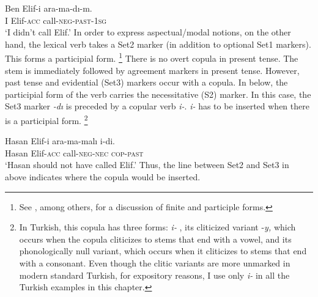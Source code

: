 \documentclass[output=paper]{langsci/langscibook}
\begin{document}
\ea%
    \label{kelepirex:key:4}
    \gll Ben Elif-i ara-ma-dı-m.\\
    I Elif-\textsc{acc} call-\textsc{neg}-\textsc{past}-\textsc{1sg} \\
    \glt `I didn't call Elif.'
\z 
In order to express aspectual/modal notions, on the other hand, the lexical verb takes a Set2 marker (in addition to optional Set1 markers). 
This forms a participial form.%
\footnote{%
    See \citealt{Lees1962,Kornfilt1996,Goksel1997,Kelepir2001,Sezer2001}, among others, 
    for a discussion of finite and participle forms.
} 
There is no overt copula in present tense. 
The stem is immediately followed by agreement markers in present tense. 
However, past tense and evidential (Set3) markers  occur with a copula. 
In  below, the participial form of the verb carries the necessitative (S2) marker. 
In this case, the Set3 marker \textit{-dı} is preceded by a copular verb \textit{i-}. 
\textit{i-} has to be inserted when there is a participial form.%
\footnote{%
    In Turkish, this copula has three forms: 
    \textit{i-} , 
    its cliticized variant -\textit{y,} which occurs when the copula cliticizes to stems that end with a vowel, 
    and its phonologically null variant, which occurs when it cliticizes to stems that end with a consonant. 
    Even though the clitic variants are more unmarked in modern standard Turkish, for expository reasons, 
    I use only \textit{i-} in all the Turkish examples in this chapter.\label{kelepirftn:key:7}
}

\ea%
    \label{kelepirex:key:5}
    \gll Hasan Elif-i ara-ma-malı i-di.\\
    Hasan Elif-\textsc{acc} call-\textsc{neg}{}-\textsc{nec} \textsc{cop}{}-\textsc{past} \\
    \glt `Hasan should not have called Elif.'
    \z
Thus, the line between Set2 and Set3 in  above indicates where the copula would be inserted. 
\end{document}
